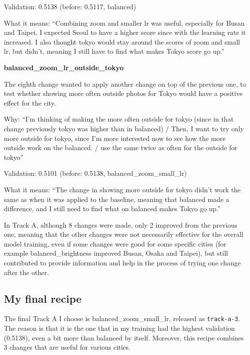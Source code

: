 \documentclass[11pt]{article}
\begin{document}
{Validation: 0.5138 (before: 0.5117, balanced)\par
What it means: ``Combining zoom and smaller lr was useful, especially for Busan and Taipei. I expected Seoul to have a higher score since with the learning rate it increased. I also thought tokyo would stay around the scores of zoom and small lr, but didn't, meaning I still have to find what makes Tokyo score go up.''
\par\medskip\noindent\textbf{balanced\_zoom\_lr\_outside\_tokyo}\par
The eighth change wanted to apply another change on top of the previous one, to test whether showing more often outside photos for Tokyo would have a positive effect for the city.\par
Why: ``I'm thinking of making the more often outside for tokyo (since in that change previously tokyo was higher than in balanced) / Then, I want to try only more outside for tokyo, since I'm more interested now to see how the more outside work on the balanced. / use the same twice as often for the outside for tokyo''\par
Validation: 0.5101 (before: 0.5138, balanced\_zoom\_small\_lr)\par
What it means: ``The change in showing more outside for tokyo didn't work the same as when it was applied to the baseline, meaning that balanced made a difference, and I still need to find what on balanced makes Tokyo go up.''
\par}

In Track A, although 8 changes were made, only 2 improved from the previous one, meaning that the other changes were not necessarily effective for the overall model training, even if some changes were good for some specific cities (for example balanced\_brightness improved Busan, Osaka and Taipei), but still contributed to provide information and help in the process of trying one change after the other.

\subsection*{My final recipe}
The final Track A I choose is balanced\_zoom\_small\_lr, released as \texttt{track-a-3}. The reason is that it is the one that in my training had the highest validation (0.5138), even a bit more than balanced by itself. Moreover, this recipe combines 3 changes that are useful for various cities.

\end{document}
